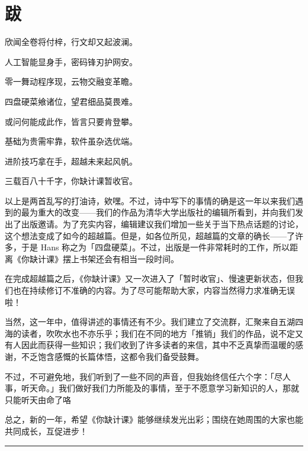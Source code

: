 \chapter*{跋}
\label{afterwords}

\begin{multicols}{2}
  \centering
  欣闻全卷将付梓，行文却又起波澜。\par
  人工智能显身手，密码锋刃护网安。\par
  零一舞动程序现，云物交融变革瞻。\par
  四盘硬菜飨诸位，望君细品莫畏难。

  或问何能成此作，皆言只要肯登攀。\par
  基础为贵需牢靠，软件虽杂选优端。\par
  进阶技巧拿在手，超越未来起风帆。\par
  三载百八十千字，你缺计课暂收官。
\end{multicols}

以上是两首乱写的打油诗，欸嘿。不过，诗中写下的事情的确是这一年以来我们遇到的最为重大的改变——我们的作品为清华大学出版社的编辑所看到，并向我们发出了出版邀请。为了充实内容，编辑建议我们增加一些关于当下热点话题的讨论，这个想法变成了如今的超越篇。但是，如各位所见，超越篇的文章的确长——了许多，于是 Hans 称之为「四盘硬菜」。不过，出版是一件非常耗时的工作，所以距离《你缺计课》摆上书架还会有相当一段时间。

在完成超越篇之后，《你缺计课》又一次进入了「暂时收官」、慢速更新状态，但我们也在持续修订不准确的内容。为了尽可能帮助大家，内容当然得力求准确无误啦！

当然，这一年中，值得讲述的事情还有不少。我们建立了交流群，汇聚来自五湖四海的读者，吹吹水也不亦乐乎；我们在不同的地方「推销」我们的作品，说不定又有人因此而获得一些知识；我们收到了许多读者的来信，其中不乏真挚而温暖的感谢，不乏饱含感慨的长篇体悟，这都令我们备受鼓舞。

不过，不可避免地，我们听到了一些不同的声音，但我始终信任六个字：「尽人事，听天命。」我们做好我们力所能及的事情，至于不愿意学习新知识的人，那就只能听天由命了咯~

总之，新的一年，希望《你缺计课》能够继续发光出彩；围绕在她周围的大家也能共同成长，互促进步！


\begin{center}\rule{0.5\linewidth}{0.5pt}\end{center}


